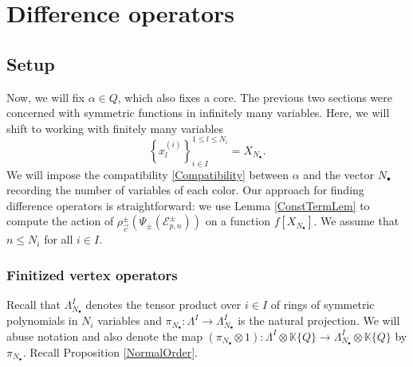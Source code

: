 \documentclass{amsart}
\newcommand{\K}{\mathbb{K}}
\newcommand{\nd}{n_\bullet}
\newcommand{\Sym}{\mathfrak{S}}
\theoremstyle{remark}
\numberwithin{thm}{section}
\numberwithin{equation}{section}
\begin{document}
\section{Difference operators}\label{Difference}


\subsection{Setup} Now, we will fix $\alpha\in Q$, which also fixes a core.
The previous two sections were concerned with symmetric functions in infinitely many variables.
Here, we will shift to working with finitely many variables 
\[
\left\{x_{l}^{(i)}\right\}_{i\in I}^{1\le l\le N_i}=X_{N_\bullet}.
\]
We will impose the compatibility \eqref{Compatibility} between $\alpha$ and the vector $N_\bullet$ recording the number of variables of each color.
Our approach for finding difference operators is straightforward: we use Lemma \ref{ConstTermLem} to compute the action of $\rho^\pm_{\vec{c}}(\Psi_\pm(\mathcal{E}_{p,n}^\pm))$ on a function $f\left[ X_{N_\bullet} \right]$.
We assume that $n\le N_i$ for all $i\in I$.

\subsubsection{Finitized vertex operators}
Recall that $\Lambda^I_{N_\bullet}$ denotes the tensor product over $i\in I$ of rings of symmetric polynomials in $N_i$ variables and $\pi_{N_\bullet}: \Lambda^I\to \Lambda^I_{N_\bullet}$ is the natural projection. 
We will abuse notation and also denote the map $(\pi_{N_\bullet}\otimes 1):\Lambda^I\otimes\K\{Q\}\rightarrow\Lambda^I_{N_\bullet}\otimes \K\{Q\}$ by $\pi_{N_\bullet}$.
Recall Proposition \ref{NormalOrder}.
\end{document}
